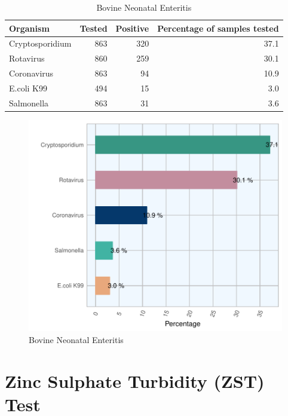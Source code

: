 \documentclass[]{book}
\begin{document}
\begin{table}

\caption{\label{tab:unnamed-chunk-67}Bovine Neonatal Enteritis}
\centering
\begin{tabular}[t]{l|r|r|r}
\hline
Organism & Tested & Positive & Percentage of samples tested\\
\hline
Cryptosporidium & 863 & 320 & 37.1\\
\hline
Rotavirus & 860 & 259 & 30.1\\
\hline
Coronavirus & 863 & 94 & 10.9\\
\hline
E.coli K99 & 494 & 15 & 3.0\\
\hline
Salmonella & 863 & 31 & 3.6\\
\hline
\end{tabular}
\end{table}

\begin{figure}

{\centering \includegraphics{AFBI_files/figure-latex/unnamed-chunk-68-1} 

}

\caption{Bovine Neonatal Enteritis}\label{fig:unnamed-chunk-68}
\end{figure}

\chapter{Zinc Sulphate Turbidity (ZST)
Test}\label{zinc-sulphate-turbidity-zst-test}
\end{document}
